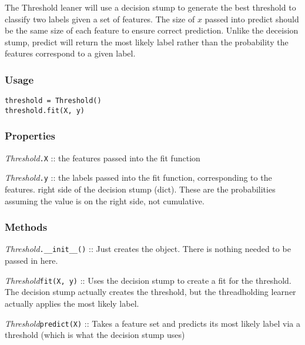 \documentclass{article}
\begin{document}
The Threshold leaner will use a decision stump to generate the best threshold to
classify two labels given a set of features. The size of $x$ passed into predict
should be the same size of each feature to ensure correct prediction. Unlike the
deceision stump, predict will return the most likely label rather than the
probability the features correspond to a given label.

\subsubsection{Usage}

\begin{verbatim}
threshold = Threshold()
threshold.fit(X, y)
\end{verbatim}

\subsubsection{Properties}

\textit{Threshold}\texttt{.X} :: the features passed into the fit function

\textit{Threshold}\texttt{.y} :: the labels passed into the fit function,
corresponding to the features.
right side of the decision stump (dict).  These are the probabilities assuming
the value is on the right side, not cumulative.

\subsubsection{Methods}

\textit{Threshold}\texttt{.\_\_init\_\_()} :: Just creates the object. There
is nothing needed to be passed in here.

\textit{Threshold}\texttt{fit(X, y)} :: Uses the decision stump to create a fit
for the threshold. The decision stump actually creates the threshold, but the
threadholding learner actually applies the most likely label.

\textit{Threshold}\texttt{predict(X)} :: Takes a feature set and predicts its
most likely label via a threshold (which is what the decision stump uses)
\end{document}
